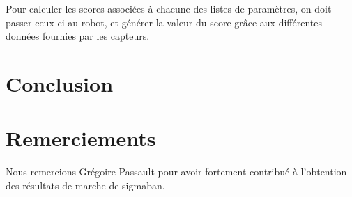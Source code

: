 \documentclass[11pt]{article}
\begin{document}
Pour calculer les scores associées à chacune des listes de paramètres, on doit passer ceux-ci au robot, et générer la valeur du score grâce aux différentes données fournies par les capteurs.

\section{Conclusion}

\section{Remerciements}
Nous remercions Grégoire Passault pour avoir fortement contribué à l'obtention des résultats de marche de sigmaban.
\end{document}
